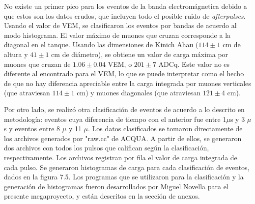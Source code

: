\documentclass{book}
\begin{document}
No existe un primer pico para los eventos de la banda electrom\'agnetica debido a que estos son los datos crudos, que incluyen todo el posible ruido de \textit{afterpulses}. Usando el valor de VEM, se clasificaron los eventos por bandas de acuerdo al modo histograma. El valor m\'aximo de muones que cruzan corresponde a la diagonal en el tanque. Usando las dimensiones de Kinich Ahau ($114\pm1$ cm de altura y $41\pm1$ cm de di\'ametro), se obtiene un valor de carga m\'axima por muones que cruzan de $1.06\pm0.04$ VEM, o $201\pm7$ ADCq. Este valor no es diferente al encontrado para el VEM, lo que se puede interpretar como el hecho de que no hay diferencia apreciable entre la carga integrada por muones verticales (que atraviesan $114\pm1$ cm) y muones diagonales (que atraviesan $121\pm4$ cm).

Por otro lado, se realiz\'o otra clasificaci\'on de eventos de acuerdo a lo descrito en metodolog\'ia: eventos cuya diferencia de tiempo con el anterior fue entre 1$\mu$s y 3 $\mu$s y eventos entre 8 $\mu$ y 11 $\mu$. Los datos clasificados se tomaron directamente de los archivos generados por "raw.cc" de ACQUA. A partir de ellos, se generaron dos archivos con todos los pulsos que califican seg\'un la clasificaci\'on, respectivamente. Los archivos registran por fila el valor de carga integrada de cada pulso. Se generaron histogramas de carga para cada clasificaci\'on de eventos, dados en la figura 7.5. Los programas que se utilizaron para la clasificaci\'on y la generaci\'on de histogramas fueron desarrollados por Miguel Novella para el presente megaproyecto, y est\'an descritos en la secci\'on de anexos.
\end{document}
